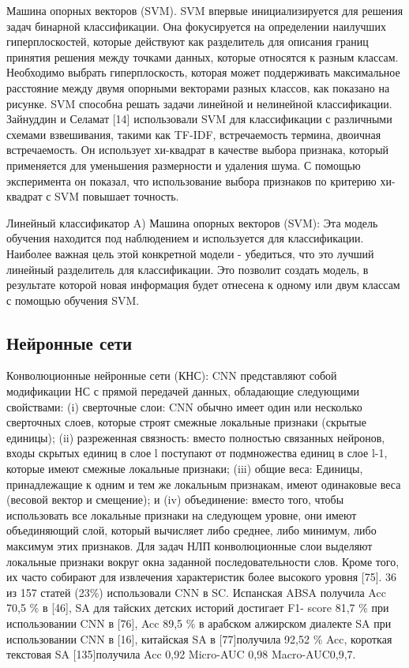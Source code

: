 Машина опорных векторов (SVM). SVM впервые инициализируется для решения задач
бинарной классификации. Она фокусируется на определении наилучших
гиперплоскостей, которые действуют как разделитель для описания границ принятия
решения между точками данных, которые относятся к разным классам. Необходимо
выбрать гиперплоскость, которая может поддерживать максимальное расстояние между
двумя опорными векторами разных классов, как показано на рисунке. SVM способна
решать задачи линейной и нелинейной классификации. Зайнуддин и Селамат [14]
использовали SVM для классификации с различными схемами взвешивания, такими как
TF-IDF, встречаемость термина, двоичная встречаемость. Он использует хи-квадрат
в качестве выбора признака, который применяется для уменьшения размерности и
удаления шума. С помощью эксперимента он показал, что использование выбора
признаков по критерию хи-квадрат с SVM повышает точность.~\cite{article16}

Линейный классификатор
A) Машина опорных векторов (SVM): Эта модель обучения находится под наблюдением
и используется для классификации. Наиболее важная цель этой конкретной модели -
убедиться, что это лучший линейный разделитель для классификации. Это позволит
создать модель, в результате которой новая информация будет отнесена к одному
или двум классам с помощью обучения SVM. ~\cite{article18}

\subsection{Нейронные сети}

Конволюционные нейронные сети (КНС): CNN представляют собой модификации НС с
прямой передачей данных, обладающие следующими свойствами: (i) сверточные слои:
CNN обычно имеет один или несколько сверточных слоев, которые строят смежные
локальные признаки (скрытые единицы); (ii) разреженная связность: вместо
полностью связанных нейронов, входы скрытых единиц в слое l поступают от
подмножества единиц в слое l-1, которые имеют смежные локальные признаки; (iii)
общие веса: Единицы, принадлежащие к одним и тем же локальным признакам, имеют
одинаковые веса (весовой вектор и смещение); и (iv) объединение: вместо того,
чтобы использовать все локальные признаки на следующем уровне, они имеют
объединяющий слой, который вычисляет либо среднее, либо минимум, либо максимум
этих признаков. Для задач НЛП конволюционные слои выделяют локальные признаки
вокруг окна заданной последовательности слов. Кроме того, их часто собирают для
извлечения характеристик более высокого уровня [75]. 36 из 157 статей (23\%)
использовали CNN в SC. Испанская ABSA получила Acc 70,5 \% в [46], SA для тайских
детских историй достигает F1- score 81,7 \% при использовании CNN в [76], Acc
89,5 \% в арабском алжирском диалекте SA при использовании CNN в [16], китайская
SA в [77]получила 92,52 \% Acc, короткая текстовая SA [135]получила Acc 0,92
Micro-AUC 0,98 Macro-AUC0,9,7.~\cite{article2}


